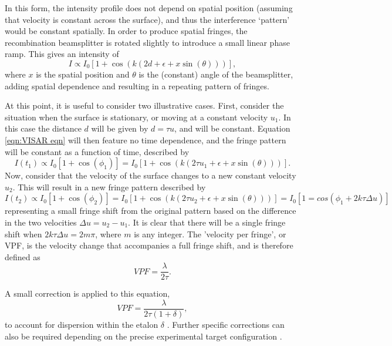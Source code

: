 In this form, the intensity profile does not depend on spatial position (assuming that velocity is constant across the surface), and thus the interference `pattern' would be constant spatially. In order to produce spatial fringes, the recombination beamsplitter is rotated slightly to introduce a small linear phase ramp. This gives an intensity of \begin{equation} \label{eqn:VISAR eqn}I \propto  I_0 [1 + \cos(k (2d + \epsilon + x\sin(\theta) ))],\end{equation} where $x$ is the spatial position and $\theta$ is the (constant) angle of the beamsplitter, adding spatial dependence and resulting in a repeating pattern of fringes.

At this point, it is useful to consider two illustrative cases. First, consider the situation when the surface is stationary, or moving at a constant velocity $u_1$. In this case the distance $d$ will be given by $d = \tau u$, and will be constant. Equation \ref{eqn:VISAR eqn} will then feature no time dependence, and the fringe pattern will be constant as a function of time, described by 
\begin{equation} I(t_1) \propto I_0 [1 + \cos(\phi_1)] =  I_0 [1 + \cos(k (2\tau u_1 + \epsilon + x\sin(\theta)))].\end{equation}
Now, consider that the velocity of the surface changes to a new constant velocity $u_2$. This will result in a new fringe pattern described by \begin{equation}I(t_2) \propto I_0 [1 + \cos(\phi_2)] =  I_0 [1 + \cos(k (2\tau u_2 + \epsilon + x\sin(\theta)))] = I_0 [1 = cos(\phi_1 + 2k\tau \Delta u)] \end{equation}
representing a small fringe shift from the original pattern based on the difference in the two velocities $\Delta u = u_2 - u_1$. It is clear that there will be a single fringe shift when $2k\tau \Delta u = 2 m \pi$, where $m$ is any integer. The 'velocity per fringe', or VPF, is the velocity change that accompanies a full fringe shift, and is therefore defined as \begin{equation} VPF = \frac{\lambda}{2\tau}. \end{equation}

A small correction is applied to this equation, \begin{equation} VPF = \frac{\lambda}{2\tau (1 + \delta)}, \end{equation} to account for dispersion within the etalon $\delta$ \cite{Barker1974}. Further specific corrections can also be required depending on the precise experimental target configuration \cite{Barker1970, Celliers2004}.

